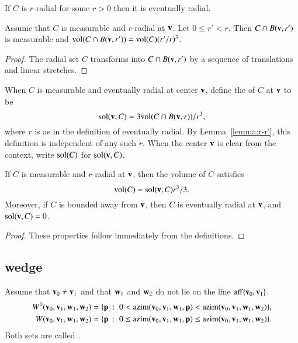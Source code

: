 \begin{lemma}
If $C$ is $r$-radial for some $r>0$ then it is eventually radial.
\end{lemma}

\begin{lemma}\label{lemma:r-r'}
Assume that $C$ is measurable and $r$-radial at ${\mathbf v}$.  Let $0\le
r'<r$.   Then $C\cap B({\mathbf v},r')$ is measurable and ${\operatorname{vol}}(C\cap
B({\mathbf v},r')) = {\operatorname{vol}}(C) (r'/r)^3$.
\end{lemma}

\begin{proof}  The radial set $C$ transforms into $C\cap B({\mathbf v},r')$ by
a sequence of translations and linear stretches.
\end{proof}


\begin{definition}\label{def:sol}
When $C$ is measurable and eventually radial at center ${\mathbf v}$, 
define the  of $C$ at ${\mathbf v}$ to be
\[ 
\operatorname{sol}({\mathbf v},C) = 3 {\operatorname{vol}}(C\cap B({\mathbf v},r))/r^3,
\] 
where $r$ is as in the definition of eventually radial. 
By Lemma~\ref{lemma:r-r'}, this
definition is independent of any such $r$.  When the center ${\mathbf v}$ is
clear from the context, write $\operatorname{sol}(C)$ for
$\operatorname{sol}({\mathbf v},C)$.
%
%
\end{definition}


\begin{lemma}
If $C$ is measurable and $r$-radial at ${\mathbf v}$, then the volume of $C$
satisfies
\[ 
{\operatorname{vol}}(C) = \operatorname{sol}({\mathbf v},C) r^3/3.
\] 
Moreover,
if $C$ is bounded away from ${\mathbf v}$, then $C$ is eventually radial at
${\mathbf v}$, and $\operatorname{sol}({\mathbf v},C) = 0$.
%
\end{lemma}

\begin{proof}
These properties follow immediately from the definitions.
\end{proof}



\subsection{wedge}
%


\begin{definition}[wedge]\label{def:wedge}
Assume that ${\mathbf v}_0\ne {\mathbf v}_1$ and that
${\mathbf w}_1$ and ${\mathbf w}_2$ do not lie on
the line ${\operatorname{aff}}\{{\mathbf v}_0,{\mathbf v}_1\}$.  
\begin{align*}
W^0(\v_0,\v_1,\w_1,\w_2) &= 
\{\p %
\mid 
0< \op{azim}(\v_0,\v_1,\w_1,\p) < \op{azim}(\v_0,\v_1,\w_1,\w_2)\},\\
W(\v_0,\v_1,\w_1,\w_2) &= 
\{\p \mid 
0\le \op{azim}(\v_0,\v_1,\w_1,\p) \le \op{azim}(\v_0,\v_1,\w_1,\w_2)\}.\\
\end{align*}
Both sets are called .
\end{definition}

